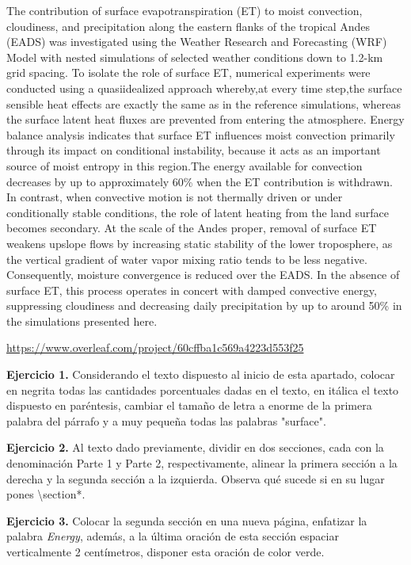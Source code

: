 \documentclass{article}
\begin{document}
The contribution of surface evapotranspiration (ET) to moist convection, cloudiness, and precipitation along the eastern ﬂanks of the tropical Andes (EADS) was investigated using the Weather Research and Forecasting (WRF) Model with nested simulations of selected weather conditions down to 1.2-km grid spacing. To isolate the role of surface ET, numerical experiments were conducted using a quasi\-idealized approach whereby,at every time step,the surface sensible heat effects are exactly the same as in the reference simulations, whereas the surface latent heat ﬂuxes are prevented from entering the atmosphere. Energy balance analysis indicates that surface ET inﬂuences moist convection primarily through its impact on conditional instability, because it acts as an important source of moist entropy in this region.The energy available for convection decreases by up to approximately 60\% when the ET contribution is withdrawn. In contrast, when convective motion is not thermally driven or under conditionally stable conditions, the role of latent heating from the land surface becomes secondary. At the scale of the Andes proper, removal of surface ET weakens upslope ﬂows by increasing static stability of the lower troposphere, as the vertical gradient of water vapor mixing ratio tends to be less negative. Consequently, moisture convergence is reduced over the EADS. In the absence of surface ET, this process operates in concert with damped convective energy, suppressing cloudiness and decreasing daily precipitation by up to around 50\% in the simulations presented here.


\url{https://www.overleaf.com/project/60cffba1c569a4223d553f25}

\textbf{Ejercicio 1.} Considerando el texto dispuesto al inicio de esta apartado, colocar en negrita todas las cantidades porcentuales dadas en el texto, en itálica el texto dispuesto en paréntesis, cambiar el tamaño de letra a enorme de la primera palabra del párrafo y a muy pequeña todas las palabras "surface".

\textbf{Ejercicio 2.} Al texto dado previamente, dividir en dos secciones, cada con la denominación Parte 1 y Parte 2, respectivamente, alinear la primera sección a la derecha y la segunda sección a la izquierda. Observa qué sucede si en su lugar pones \textbackslash section*.

\textbf{Ejercicio 3.} Colocar la segunda sección en una nueva página, enfatizar la palabra \textit{Energy}, además, a la última oración de esta sección espaciar verticalmente 2 centímetros, disponer esta oración de color verde.
\end{document}
